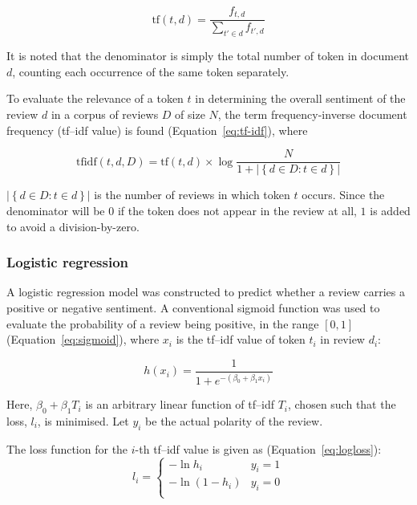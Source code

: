 \documentclass[12pt, a4paper]{pancake-article}
\begin{document}
\begin{equation}
	\text{tf}\left(t, d\right) = \frac{f_{t, d}}{\sum_{t' \in d}^{}f_{t',d}}
	\label{eq:term-frequency}
\end{equation}

It is noted that the denominator is simply the total number of token in document \(d\),
counting each occurrence of the same token separately.

To evaluate the relevance of a token \(t\) in determining the overall sentiment of the
review \(d\) in a corpus of reviews \(D\) of size \(N\), the term frequency-inverse document frequency
(tf--idf value) is found (Equation~\ref{eq:tf-idf}), where

\begin{equation}
	\text{tfidf}\left(t, d, D\right) = \text{tf}\left(t, d\right)\times\log\frac{N}{1 + \left|\left\{d \in D : t\in d\right\}\right|}
	\label{eq:tf-idf}
\end{equation}

\(\left|\left\{d \in D : t \in d\right\}\right|\) is the number of reviews in which token \(t\) occurs.
Since the denominator will be \(0\) if the token does not appear in the review at all, \(1\) is added
to avoid a division-by-zero.

\subsubsection{Logistic regression}

A logistic regression model was constructed to predict whether a review carries a positive or negative sentiment.
A conventional sigmoid function was used to evaluate the probability of a review being positive, in the range
\(\left[0, 1\right]\) (Equation~\ref{eq:sigmoid}), where \(x_i\) is the tf--idf value of token \(t_i\) in
review \(d_i\):

\begin{equation}
	h\left(x_i\right)	= \frac{1}{1 + e^{-\left(\beta_0 + \beta_1 x_i\right)}}
	\label{eq:sigmoid}
\end{equation}

Here, \(\beta_0 + \beta_1 T_i\) is an arbitrary linear function of tf--idf \(T_i\), chosen
such that the loss, \(l_i\), is minimised. Let \(y_i\) be the actual polarity of the review.

The loss function for the \(i\)-th tf--idf value is given as (Equation~\ref{eq:logloss}):
\begin{equation}
	l_i = \begin{cases}
		- \ln h_i                  & y_i = 1 \\
		- \ln \left(1 - h_i\right) & y_i = 0 \\
	\end{cases}
	\label{eq:logloss}
\end{equation}
\end{document}
